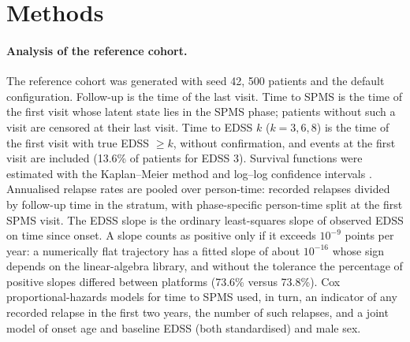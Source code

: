 \documentclass[11pt,a4paper]{article}
\begin{document}
\section*{Methods}

\paragraph{Analysis of the reference cohort.}
The reference cohort was generated with seed 42, 500 patients and the default configuration. Follow-up is the time of the last visit. Time to SPMS is the time of the first visit whose latent state lies in the SPMS phase; patients without such a visit are censored at their last visit. Time to EDSS $k$ ($k=3,6,8$) is the time of the first visit with true EDSS $\geq k$, without confirmation, and events at the first visit are included (13.6\% of patients for EDSS 3). Survival functions were estimated with the Kaplan--Meier method and log--log confidence intervals \cite{davidsonpilon2019}. Annualised relapse rates are pooled over person-time: recorded relapses divided by follow-up time in the stratum, with phase-specific person-time split at the first SPMS visit. The EDSS slope is the ordinary least-squares slope of observed EDSS on time since onset. A slope counts as positive only if it exceeds $10^{-9}$ points per year: a numerically flat trajectory has a fitted slope of about $10^{-16}$ whose sign depends on the linear-algebra library, and without the tolerance the percentage of positive slopes differed between platforms (73.6\% versus 73.8\%). Cox proportional-hazards models for time to SPMS used, in turn, an indicator of any recorded relapse in the first two years, the number of such relapses, and a joint model of onset age and baseline EDSS (both standardised) and male sex.
\end{document}
